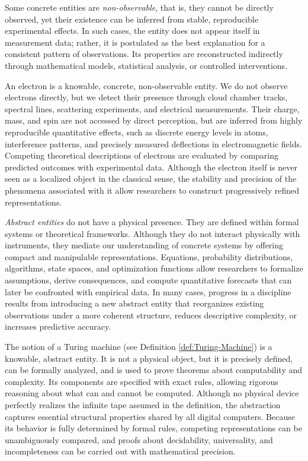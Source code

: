 Some concrete entities are \emph{non-observable}, that is, they cannot be directly observed, yet their existence can be inferred from stable, reproducible experimental effects. In such cases, the entity does not appear itself in measurement data; rather, it is postulated as the best explanation for a consistent pattern of observations. Its properties are reconstructed indirectly through mathematical models, statistical analysis, or controlled interventions.

\begin{example}
An electron is a knowable, concrete, non-observable entity. We do not observe electrons directly, but we detect their presence through cloud chamber tracks, spectral lines, scattering experiments, and electrical measurements. Their charge, mass, and spin are not accessed by direct perception, but are inferred from highly reproducible quantitative effects, such as discrete energy levels in atoms, interference patterns, and precisely measured deflections in electromagnetic fields. Competing theoretical descriptions of electrons are evaluated by comparing predicted outcomes with experimental data. Although the electron itself is never seen as a localized object in the classical sense, the stability and precision of the phenomena associated with it allow researchers to construct progressively refined representations.
\end{example}

\emph{Abstract entities} do not have a physical presence. They are defined within formal systems or theoretical frameworks. Although they do not interact physically with instruments, they mediate our understanding of concrete systems by offering compact and manipulable representations. Equations, probability distributions, algorithms, state spaces, and optimization functions allow researchers to formalize assumptions, derive consequences, and compute quantitative forecasts that can later be confronted with empirical data. In many cases, progress in a discipline results from introducing a new abstract entity that reorganizes existing observations under a more coherent structure, reduces descriptive complexity, or increases predictive accuracy. 

\begin{example}
The notion of a Turing machine (see Definition \ref{def:Turing-Machine}) is a knowable, abstract entity. It is not a physical object, but it is precisely defined, can be formally analyzed, and is used to prove theorems about computability and complexity. Its components are specified with exact rules, allowing rigorous reasoning about what can and cannot be computed. Although no physical device perfectly realizes the infinite tape assumed in the definition, the abstraction captures essential structural properties shared by all digital computers. Because its behavior is fully determined by formal rules, competing representations can be unambiguously compared, and proofs about decidability, universality, and incompleteness can be carried out with mathematical precision.
\end{example}

